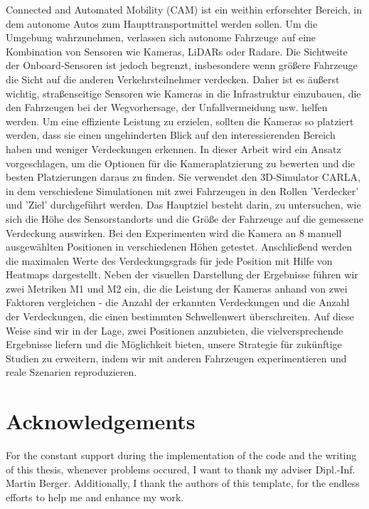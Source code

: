 Connected and Automated Mobility (CAM) ist ein weithin erforschter Bereich, in dem autonome Autos zum Haupttransportmittel werden sollen. Um die Umgebung wahrzunehmen, verlassen sich autonome Fahrzeuge auf eine Kombination von Sensoren wie Kameras, LiDARs oder Radare. Die Sichtweite der Onboard-Sensoren ist jedoch begrenzt, insbesondere wenn größere Fahrzeuge die Sicht auf die anderen Verkehrsteilnehmer verdecken. Daher ist es äußerst wichtig, straßenseitige Sensoren wie Kameras in die Infrastruktur einzubauen, die den Fahrzeugen bei der Wegvorhersage, der Unfallvermeidung usw. helfen werden. Um eine effiziente Leistung zu erzielen, sollten die Kameras so platziert werden, dass sie einen ungehinderten Blick auf den interessierenden Bereich haben und weniger Verdeckungen erkennen. In dieser Arbeit wird ein Ansatz vorgeschlagen, um die Optionen für die Kameraplatzierung zu bewerten und die besten Platzierungen daraus zu finden. Sie verwendet den 3D-Simulator CARLA, in dem verschiedene Simulationen mit zwei Fahrzeugen in den Rollen 'Verdecker' und 'Ziel' durchgeführt werden. Das Hauptziel besteht darin, zu untersuchen, wie sich die Höhe des Sensorstandorts und die Größe der Fahrzeuge auf die gemessene Verdeckung auswirken. Bei den Experimenten wird die Kamera an 8 manuell ausgewählten Positionen in verschiedenen Höhen getestet. Anschließend werden die maximalen Werte des Verdeckungsgrads für jede Position mit Hilfe von Heatmaps dargestellt. Neben der visuellen Darstellung der Ergebnisse führen wir zwei Metriken M1 und M2 ein, die die Leistung der Kameras anhand von zwei Faktoren vergleichen - die Anzahl der erkannten Verdeckungen und die Anzahl der Verdeckungen, die einen bestimmten Schwellenwert überschreiten. Auf diese Weise sind wir in der Lage, zwei Positionen anzubieten, die vielversprechende Ergebnisse liefern und die Möglichkeit bieten, unsere Strategie für zukünftige Studien zu erweitern, indem wir mit anderen Fahrzeugen experimentieren und reale Szenarien reproduzieren.

\newpage
\chapter*{Acknowledgements}
For the constant support during the implementation of the code and the writing of this thesis, whenever problems occured, I want to thank my adviser Dipl.-Inf. Martin Berger. Additionally, I thank the authors of this template, for the endless efforts to help me and enhance my work.
